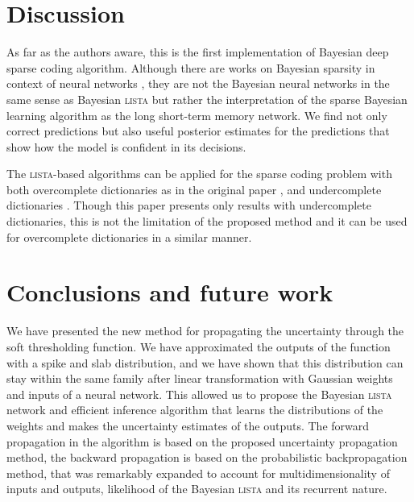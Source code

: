 \documentclass[letterpaper]{article}
\begin{document}
\section{Discussion}
\label{sec:discussion}
As far as the authors aware, this is the first implementation of Bayesian deep sparse coding algorithm. Although there are works on Bayesian sparsity in context of neural networks \citep{he2017bayesian}, they are not the Bayesian neural networks in the same sense as Bayesian \textsc{lista} but rather the interpretation of the sparse Bayesian  learning algorithm as the long short-term memory network. We find not only correct predictions but also useful posterior estimates for the predictions that show how the model is confident in its decisions. 


The \textsc{lista}-based algorithms can be applied for the sparse coding problem with both overcomplete dictionaries as in the original paper \citep{gregor2010learning}, and undercomplete dictionaries \citep{borgerding2017amp}. Though this paper presents only results with undercomplete dictionaries, this is not the limitation of the proposed method and it can be used for overcomplete dictionaries in a similar manner.

\section{Conclusions and future work}
\label{sec:conclusions}
We have presented the new method for propagating the uncertainty through the soft thresholding function. %
We have approximated the outputs of the function with a spike and slab distribution, and we have shown that this distribution can stay within the same family after linear transformation with Gaussian weights and inputs of a neural network. This allowed us to propose the Bayesian \textsc{lista} network and efficient inference algorithm that learns the distributions of the weights and makes the uncertainty estimates of the outputs. The forward propagation in the algorithm is based on the proposed uncertainty propagation method, the backward propagation is based on the probabilistic backpropagation method, that was remarkably expanded to account for multidimensionality of inputs and outputs, likelihood of the Bayesian \textsc{lista} and its recurrent nature.
\end{document}
